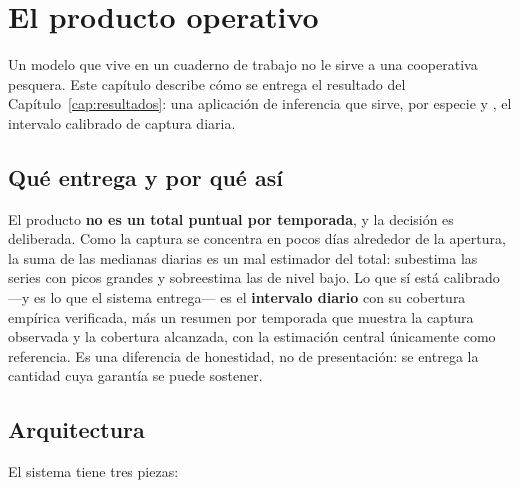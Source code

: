 \chapter{El producto operativo}
\label{cap:producto}

Un modelo que vive en un cuaderno de trabajo no le sirve a una cooperativa pesquera. Este
capítulo describe cómo se entrega el resultado del Capítulo~\ref{cap:resultados}: una
aplicación de inferencia que sirve, por especie y \ue{}, el intervalo calibrado de captura
diaria.

\section{Qué entrega y por qué así}

El producto \textbf{no es un total puntual por temporada}, y la decisión es deliberada. Como la
captura se concentra en pocos días alrededor de la apertura, la suma de las medianas diarias es
un mal estimador del total: subestima las series con picos grandes y sobreestima las de nivel
bajo. Lo que sí está calibrado ---y es lo que el sistema entrega--- es el \textbf{intervalo
diario} con su cobertura empírica verificada, más un resumen por temporada que muestra la
captura observada y la cobertura alcanzada, con la estimación central únicamente como
referencia. Es una diferencia de honestidad, no de presentación: se entrega la cantidad cuya
garantía se puede sostener.

\section{Arquitectura}

El sistema tiene tres piezas:

